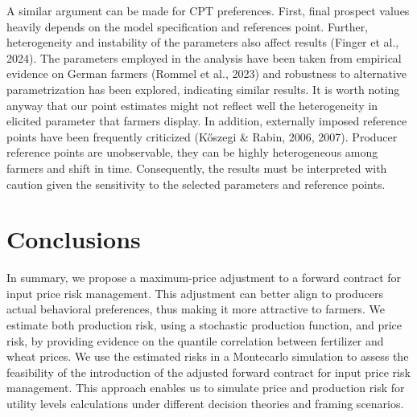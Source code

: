 \documentclass[
]{article}
\begin{document}
A similar argument can be made for CPT preferences. First, final
prospect values heavily depends on the model specification and
references point. Further, heterogeneity and instability of the
parameters also affect results (Finger et al., 2024). The parameters
employed in the analysis have been taken from empirical evidence on
German farmers (Rommel et al., 2023) and robustness to alternative
parametrization has been explored, indicating similar results. It is
worth noting anyway that our point estimates might not reflect well the
heterogeneity in elicited parameter that farmers display. In addition,
externally imposed reference points have been frequently criticized
(Kőszegi \& Rabin, 2006, 2007). Producer reference points are
unobservable, they can be highly heterogeneous among farmers and shift
in time. Consequently, the results must be interpreted with caution
given the sensitivity to the selected parameters and reference points.

\section{Conclusions}\label{conclusions}

In summary, we propose a maximum-price adjustment to a forward contract
for input price risk management. This adjustment can better align to
producers\textquotesingle{} actual behavioral preferences, thus making
it more attractive to farmers. We estimate both production risk, using a
stochastic production function, and price risk, by providing evidence on
the quantile correlation between fertilizer and wheat prices. We use the
estimated risks in a Montecarlo simulation to assess the feasibility of
the introduction of the adjusted forward contract for input price risk
management. This approach enables us to simulate price and production
risk for utility levels calculations under different decision theories
and framing scenarios.
\end{document}
